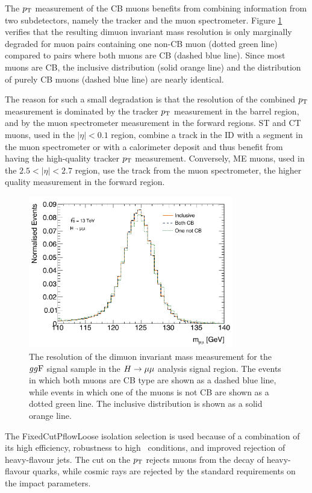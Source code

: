 The $p_{\text{T}}$ measurement of the CB muons benefits from combining
information from two subdetectors, namely the tracker and the
muon spectrometer.
Figure \ref{fig:hmumu:reso} verifies that the resulting dimuon
invariant mass resolution is only marginally degraded for muon
pairs containing one non-CB muon (dotted green line) compared
to pairs where both muons are CB (dashed blue line). Since
most muons are CB, the inclusive distribution (solid orange
line) and the distribution of purely CB muons (dashed blue line)
are nearly identical.

The reason for such a small degradation is that the resolution of the combined
$p_{\text{T}}$ measurement is dominated by the tracker $p_{\text{T}}$ measurement
in the barrel region, and by the muon spectrometer measurement
in the forward regions. ST and CT muons, used in the $|\eta| <
0.1$ region, combine a track in the ID with a segment in the
muon spectrometer or with a calorimeter deposit and thus 
benefit from having the high-quality tracker $p_{\text{T}}$ measurement.
Conversely, ME muons, used in the $2.5 < |\eta| < 2.7$ region,
use the track from the muon spectrometer, the higher quality
measurement in the forward region.
\begin{figure}[h!]
  \centering
  \includegraphics[width=0.8\textwidth]{figures/hmumu/resolution}
  \caption[Muon resolution for different muon types]{The resolution
  of the dimuon invariant mass measurement for the $gg\text{F}$ signal
  sample in the $H \rightarrow \mu\mu$ analysis signal region. The events in which
  both muons are CB type are shown as a dashed blue line, while
  events in which one of the muons is not CB are shown as a dotted
  green line. The inclusive distribution is shown as a solid orange
  line.}
  \label{fig:hmumu:reso}
\end{figure}
The FixedCutPflowLoose isolation selection is used because
of a combination of its high efficiency, robustness to high
\pileup~conditions, and improved rejection of heavy-flavour
jets. The cut on the $p_{\text{T}}$ rejects muons from the decay of
heavy-flavour quarks, while cosmic rays are rejected by the
standard requirements on the impact parameters.

